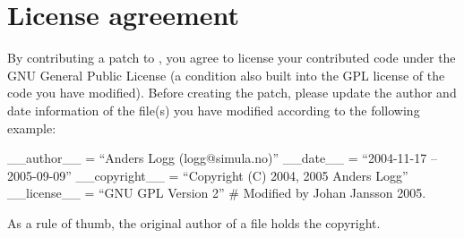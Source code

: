 

\section{License agreement}

By contributing a patch to \package{}, you agree to license your
contributed code under the GNU General Public License (a condition
also built into the GPL license of the code you have modified). Before
creating the patch, please update the author and date information of
the file(s) you have modified according to the following example:

\begin{code}
__author__ = ``Anders Logg (logg@simula.no)''
__date__ = ``2004-11-17 -- 2005-09-09''
__copyright__ = ``Copyright (C) 2004, 2005 Anders Logg''
__license__  = ``GNU GPL Version 2''
# Modified by Johan Jansson 2005.
\end{code}

As a rule of thumb, the original author of a file holds the copyright.
